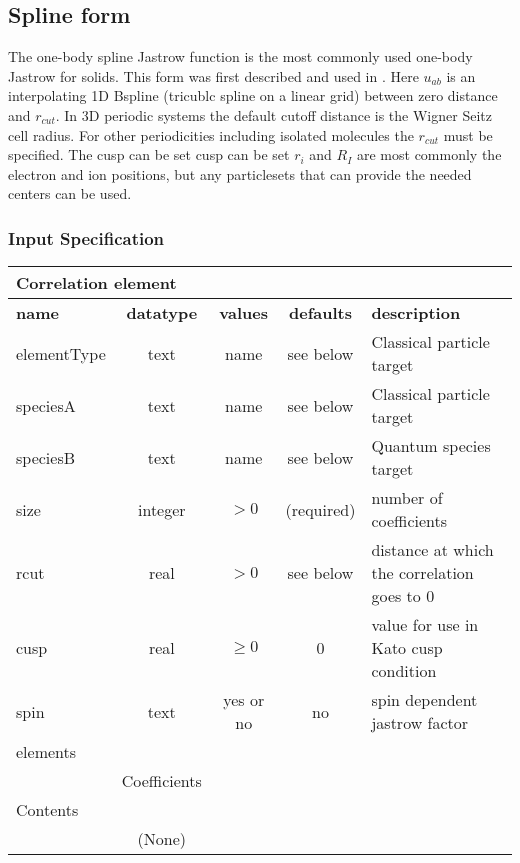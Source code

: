 \subsection{Spline form}
\label{sec:onebodyjastrowspline}

The one-body spline Jastrow function is the most commonly used one-body Jastrow for solids. This form 
was first described and used in \cite{EslerKimCeperleyShulenburger2012}.  
Here $u_{ab}$ is an interpolating 1D Bspline (tricublc spline on a linear grid) between zero distance and $r_{cut}$. In 3D periodic systems 
the default cutoff distance is the Wigner Seitz cell radius. For other periodicities including isolated 
molecules the $r_{cut}$ must be specified. The cusp can be set cusp can be set  $r_i$ 
and $R_I$ are most commonly the electron and ion positions, but any particlesets that can provide the 
needed centers can be used.

\subsubsection{Input Specification}
\begin{table}[h]
\begin{center}
\begin{tabular}{l c c c l }
\hline
\multicolumn{5}{l}{Correlation element} \\
\hline
\bfseries name & \bfseries datatype & \bfseries values & \bfseries defaults & \bfseries description \\
\hline
elementType & text & name & see below & Classical particle target  \\
speciesA & text & name & see below & Classical particle target \\
speciesB & text & name & see below & Quantum species target \\
size & integer & $> 0$ & (required) & number of coefficients \\
rcut & real & $> 0$ & see below & distance at which the correlation goes to 0 \\
cusp & real & $\ge 0$ & 0 & value for use in Kato cusp condition \\
spin & text & yes or no & no & spin dependent jastrow factor \\
\hline
\multicolumn{5}{l}{elements}\\ \hline
& Coefficients & & & \\ \hline
\multicolumn{5}{l}{Contents}\\ \hline
& (None)  & & &  \\ \hline
\end{tabular}
\end{center}
\end{table}

